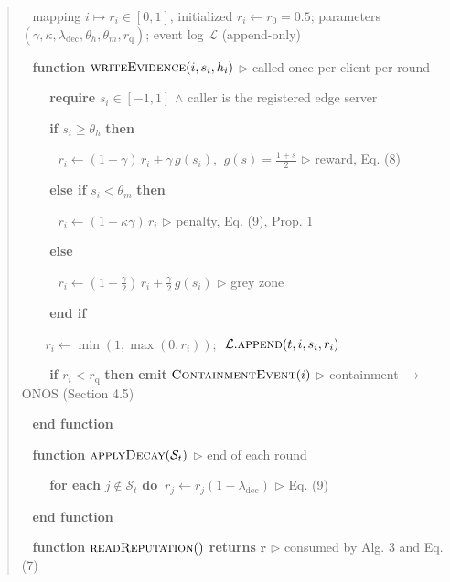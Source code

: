\documentclass[cmc,article,submit,moreauthors,pdftex]{Definitions/tsp}
\begin{document}
\begin{quote}
\noindent{}~ mapping $i \mapsto r_i \in [0,1]$, initialized $r_i \leftarrow r_0 = 0.5$; parameters $(\gamma, \kappa, \lambda_{\mathrm{dec}}, \theta_h, \theta_m, r_{\mathrm{q}})$; event log $\mathcal{L}$ (append-only)

\noindent{}~ \textbf{function} $\textsc{writeEvidence}(i, s_i, h_i)$  $\triangleright$ called once per client per round

\noindent{}~ $\quad$ \textbf{require} $s_i \in [-1, 1]$ $\wedge$ caller is the registered edge server

\noindent{}~ $\quad$ \textbf{if} $s_i \geq \theta_h$ \textbf{then}

\noindent{}~ $\quad\quad r_i \leftarrow (1-\gamma)\, r_i + \gamma\, g(s_i)$, $\ g(s) = \tfrac{1+s}{2}$  $\triangleright$ reward, Eq. (8)

\noindent{}~ $\quad$ \textbf{else if} $s_i < \theta_m$ \textbf{then}

\noindent{}~ $\quad\quad r_i \leftarrow (1 - \kappa\gamma)\, r_i$  $\triangleright$ penalty, Eq. (9), Prop. 1

\noindent{}~ $\quad$ \textbf{else}

\noindent{}~ $\quad\quad r_i \leftarrow (1 - \tfrac{\gamma}{2})\, r_i + \tfrac{\gamma}{2}\, g(s_i)$  $\triangleright$ grey zone

\noindent{}~ $\quad$ \textbf{end if}

\noindent{}~ $\quad r_i \leftarrow \min(1, \max(0, r_i))$; $\ \mathcal{L}.\textsc{append}(t, i, s_i, r_i)$

\noindent{}~ $\quad$ \textbf{if} $r_i < r_{\mathrm{q}}$ \textbf{then emit} $\textsc{ContainmentEvent}(i)$  $\triangleright$ containment $\rightarrow$ ONOS (Section 4.5)

\noindent{}~ \textbf{end function}

\noindent{}~ \textbf{function} $\textsc{applyDecay}(\mathcal{S}_t)$  $\triangleright$ end of each round

\noindent{}~ $\quad$ \textbf{for each} $j \notin \mathcal{S}_t$ \textbf{do} $\ r_j \leftarrow r_j (1 - \lambda_{\mathrm{dec}})$  $\triangleright$ Eq. (9)

\noindent{}~ \textbf{end function}

\noindent{}~ \textbf{function} $\textsc{readReputation}()$ \textbf{returns} $\mathbf{r}$  $\triangleright$ consumed by Alg. 3 and Eq. (7)
\end{quote}
\end{document}
